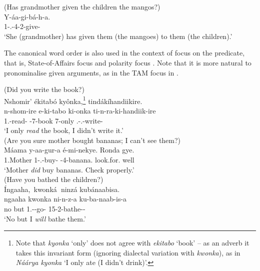 \documentclass[output=paper]{langscibook}
\begin{document}
\ea
\label{bkm:Ref113368013}
(Has grandmother given the children the mangos?)\\
\gll
Y-áa-gi-bá-h-a.\\
1\SM{}-\N{}.\PST{}-4\OM{}-2\OM{}-give-\FV{}\\
\glt
‘She (grandmother) has given them (the mangoes) to them (the children).’\\

\z

The canonical word order is also used in the context of focus on the predicate, that is, State-of-Affairs focus  and polarity focus . Note that it is more natural to pronominalise given arguments, as in the TAM focus in .

\ea
\label{bkm:Ref116997318}
\ea
\label{bkm:Ref116997318:a}
(Did you write the book?)\\
Nshomir’ ékitabó kyônka,\footnote{Note that \textit{kyonka} ‘only’ does not agree with \textit{ekitabo} ‘book’ – as an adverb it takes this invariant form (ignoring dialectal variation with \textit{kwonka}), as in \textit{Náárya kyonka} ‘I only ate (I didn't drink)’.} tindákíhandiikire.\\
\gll
n-shom-ire  e-ki-tabo  ki-onka  ti-n-ra-ki-handiik-ire\\
1\SG{}.\SM{}-read-\PFV{}  \AUG{}-7-book  7-only  \SG.\SM-\F.\OM{}-write-\PFV{}\\
\glt
‘I only \textit{read} the book, I didn’t write it.’\\



\ex
\label{bkm:Ref116997318:b}
(Are you sure mother bought bananas; I can’t see them?)\\
\gll
Máama  y-aa-gur-a  é-mi-nekye.  Ronda  gye.\\
1.Mother  1\SM{}-\N{}.\PST{}-buy-\FV{}  \AUG{}-4-banana.{} look.for.\IMP{} well\\
\glt
‘Mother \textit{did} buy bananas. Check properly.’\\

\ex
\label{bkm:Ref116997318:c}
(Have you bathed the children?)\\
Íngaaha,~kwonká\textbf{~}ninzá kubánaabisa.~\\
\gll
ngaaha  kwonka  ni-n-z-a  ku-ba-naab-is-a\\
no  but  1\SG{}.\SM{}-\PRS{}-go-\FV{}  15-2\OM{}-bathe-\CAUS{}-\FV{}\\
\glt
‘No but I \textit{will} bathe them.’\\
\end{document}
